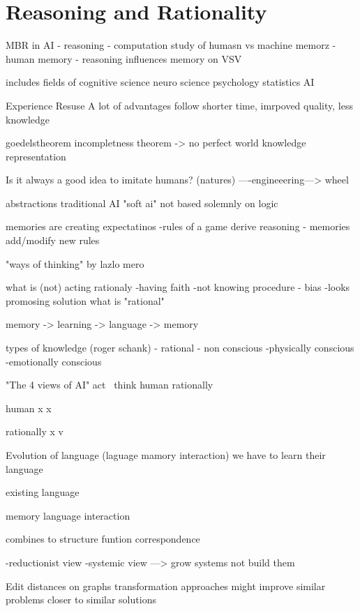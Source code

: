 \documentclass[10pt,oneside,a4paper]{scrartcl}
\begin{document}
	


%
%

\section{Reasoning and Rationality}
MBR in AI
- reasoning
- computation study of humasn vs machine memorz
- human memory
- reasoning influences memory on VSV

includes fields of 
cognitive science
neuro science
psychology
statistics
AI


Experience Resuse
A lot of advantages follow
	shorter time, imrpoved quality, less knowledge

goedelstheorem incompletness theorem -> no perfect world knowledge representation


Is it always a good idea to imitate humans? (natures)  ----engineeering---> wheel

abstractions 
     traditional AI
     "soft ai" not based solemnly on logic

memories are creating expectatinos
-rules of a game derive reasoning
- memories add/modify new rules


"ways of thinking" by lazlo mero


what is (not) acting rationaly
-having faith
-not knowing procedure
- bias
-looks promosing solution               what is "rational"

memory -> learning  -> language -> memory

types of knowledge (roger schank)
- rational
- non conscious
-physically conscious
-emotionally conscious

"The 4 views of AI"
act \ think   human   rationally

human         x                     x

rationally     x                   v


Evolution of language (laguage mamory interaction)
 we have to learn their language

existing language

memory
language
interaction

combines to structure funtion correspondence

-reductionist view
-systemic view ---> grow systems not build them







Edit distances on graphs
transformation approaches                might improve similar problems closer to similar solutions
\end{document}
